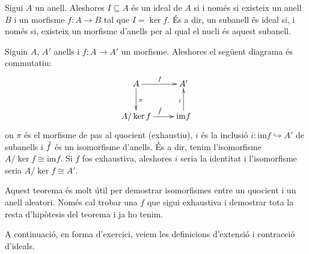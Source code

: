 \documentclass[../main.tex]{subfiles}
\begin{document}
\begin{prop}
Sigui $A$ un anell. Aleshores $I\subseteq A$ és un ideal de $A$ si i només si existeix un anell $B$ i un morfisme $f:A\rightarrow B$ tal que $I = \ker f$. És a dir, un subanell és ideal si, i només si, existeix un morfisme d'anells per al qual el nucli és aquest subanell.
\end{prop}

\begin{ter}
\label{ter:teoremaisomorfia} Siguin $A$, $A'$ anells i $f:A\to A'$ un morfisme. Aleshores el següent diagrama és commutatiu:
\begin{equation}
    \notag
    \xymatrix{
    A\ar[r]^f \ar[d]^\pi & A'\\
    A/\ker f \ar[r]^{\Tilde{f}} & \mathrm{im}f\ar[u]^{i}
    }
\end{equation}
on $\pi$ és el morfisme de pas al quocient (exhaustiu), $i$ és la inclusió $i:\mathrm{im}f\hookrightarrow A'$ de subanells i $\Tilde{f}$ és un isomorfisme d'anells. És a dir, tenim l'isomorfisme $A/\ker f\cong\mathrm{im}f$. Si $f$ fos exhaustiva, aleshores $i$ seria la identitat i l'isomorfisme seria $A/\ker f\cong A'$.
\end{ter}

Aquest teorema és molt útil per demostrar isomorfismes entre un quocient i un anell aleatori. Només cal trobar una $f$ que sigui exhaustiva i demostrar tota la resta d'hipòtesis del teorema i ja ho tenim.

A continuació, en forma d'exercici, veiem les definicions d'extensió i contracció d'ideals.
\end{document}
